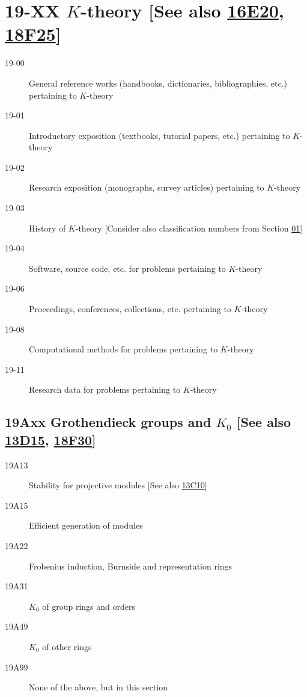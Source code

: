 \documentclass[letterpaper]{article}
\begin{document}
\section*{19-XX $K$-theory [See also \hyperref[16E20]{16E20}, \hyperref[18F25]{18F25}] }\label{19-XX}
\begin{description}
\item [19-00]\label{19-00} General reference works (handbooks, dictionaries, bibliographies, etc.) pertaining to $K$-theory
\item [19-01]\label{19-01} Introductory exposition (textbooks, tutorial papers, etc.) pertaining to $K$-theory
\item [19-02]\label{19-02} Research exposition (monographs, survey articles) pertaining to $K$-theory
\item [19-03]\label{19-03} History of $K$-theory [Consider also classification numbers from Section \hyperref[01-XX]{01}]
\item [19-04]\label{19-04} Software, source code, etc. for problems pertaining to $K$-theory
\item [19-06]\label{19-06} Proceedings, conferences, collections, etc. pertaining to $K$-theory
\item [19-08]\label{19-08} Computational methods for problems pertaining to $K$-theory
\item [19-11]\label{19-11} Research data for problems pertaining to $K$-theory
\end{description}
\subsection*{19Axx  Grothendieck groups and $K_0$ [See also \hyperref[13D15]{13D15}, \hyperref[18F30]{18F30}] }\label{19Axx}
\begin{description}  
\item [19A13]\label{19A13} Stability for projective modules [See also \hyperref[13C10]{13C10}]
\item [19A15]\label{19A15} Efficient generation of modules
\item [19A22]\label{19A22} Frobenius induction, Burnside and representation rings
\item [19A31]\label{19A31} $K_0$ of group rings and orders
\item [19A49]\label{19A49} $K_0$ of other rings
\item [19A99]\label{19A99} None of the above, but in this section
\end{description}
\end{document}
